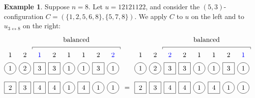 \documentclass[reqno]{amsart}
\newcommand{\0}{\phantom{c}}
\theoremstyle{plain}
\theoremstyle{definition}
\newtheorem{example}[thm]{Example}
\numberwithin{equation}{section}
\begin{document}
\begin{example}
Suppose $n = 8$.
Let $u = 12121122$, and consider the $(5,3)$-configuration $C = (\{1,2,5,6,8\}, \{5,7,8\})$.
We apply $C$ to $u$ on the left and to $u_{3 \leftrightarrow 8}$ on the right:
\[
\begin{tikzpicture}[baseline=-3]
  \def\sc{0.75}   %
  \def\lll{1.7}   %
  \def\ll{1}   %
  \def\l{0}   %
  \node[color=blue] at (3*\sc,\lll) {$1$};
  \node[color=blue] at (8*\sc,\lll) {$2$};
  \foreach \i in {1,5,6} { \node at (\i*\sc,\lll) {$1$}; }
  \foreach \i in {2,4,7} { \node at (\i*\sc,\lll) {$2$}; }
  \foreach \i in {1,2,5,6,8} { \draw (\i*\sc,\ll) circle (0.3); }
  \foreach \i in {3,4,7} { \draw (\i*\sc-.3,\ll-.3) rectangle +(0.6,+0.6); }
  \foreach \i in {1,5,6,8} { \node at (\i*\sc,\ll) {$1$}; }
  \foreach \i in {2} { \node at (\i*\sc,\ll) {$2$}; }
  \foreach \i in {3,4,7} { \node at (\i*\sc,\ll) {$3$}; }
  \foreach \i in {5,7,8} { \draw (\i*\sc,\l) circle (0.3); }
  \foreach \i in {1,2,3,4,6} { \draw (\i*\sc-.3,\l-.3) rectangle +(0.6,+0.6); }
  \foreach \i in {3,4,6} { \node at (\i*\sc,\l) {$4$}; }
  \foreach \i in {2} { \node at (\i*\sc,\l) {$3$}; }
  \foreach \i in {1} { \node at (\i*\sc,\l) {$2$}; }
  \foreach \i in {5,7,8} { \node at (\i*\sc,\l) {$1$}; }
  \draw (2.5*\sc,2) -- (2.5*\sc,2.1) -- (8.5*\sc,2.1) -- (8.5*\sc,2);
  \node at (5.5*\sc,2.5) {balanced};
\end{tikzpicture}
\hspace{3pt} = \hspace{4pt}
\begin{tikzpicture}[baseline=-3]
  \def\sc{0.75}   %
  \def\lll{1.7}   %
  \def\ll{1}   %
  \def\l{0}   %
  \node[color=blue] at (8*\sc,\lll) {$1$};
  \node[color=blue] at (3*\sc,\lll) {$2$};
  \foreach \i in {1,5,6} { \node at (\i*\sc,\lll) {$1$}; }
  \foreach \i in {2,4,7} { \node at (\i*\sc,\lll) {$2$}; }
  \foreach \i in {1,2,5,6,8} { \draw (\i*\sc,\ll) circle (0.3); }
  \foreach \i in {3,4,7} { \draw (\i*\sc-.3,\ll-.3) rectangle +(0.6,+0.6); }
  \foreach \i in {1,5,6,8} { \node at (\i*\sc,\ll) {$1$}; }
  \foreach \i in {3,4,7} { \node at (\i*\sc,\ll) {$3$}; }
  \foreach \i in {2} { \node at (\i*\sc,\ll) {$2$}; }
  \foreach \i in {5,7,8} { \draw (\i*\sc,\l) circle (0.3); }
  \foreach \i in {1,2,3,4,6} { \draw (\i*\sc-.3,\l-.3) rectangle +(0.6,+0.6); }
  \foreach \i in {3,4,6} { \node at (\i*\sc,\l) {$4$}; }
  \foreach \i in {2} { \node at (\i*\sc,\l) {$3$}; }
  \foreach \i in {1} { \node at (\i*\sc,\l) {$2$}; }
  \foreach \i in {5,7,8} { \node at (\i*\sc,\l) {$1$}; }
  \draw (2.5*\sc,2) -- (2.5*\sc,2.1) -- (8.5*\sc,2.1) -- (8.5*\sc,2);
  \node at (5.5*\sc,2.5) {balanced};
\end{tikzpicture}
\]
\end{example}
\end{document}

